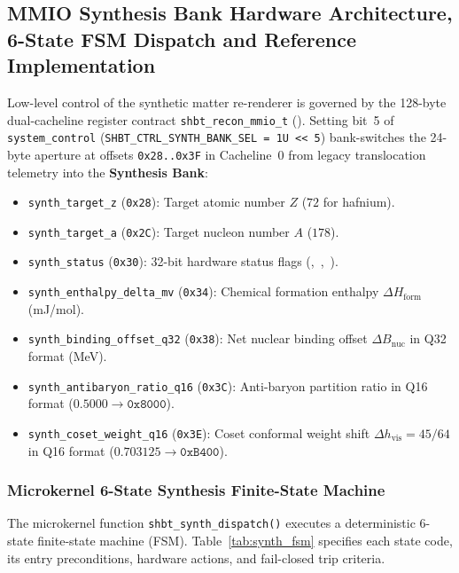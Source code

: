 \documentclass[11pt,onecolumn]{article}
\begin{document}
\FloatBarrier
\subsection[MMIO Synthesis Bank and 6-State FSM Dispatch]{MMIO Synthesis Bank Hardware Architecture, 6-State FSM Dispatch and Reference Implementation}
\label{subsec:mmio_synth_fsm}
Low-level control of the synthetic matter re-renderer is governed by the 128-byte dual-cacheline register contract \texttt{shbt\_recon\_mmio\_t} (). Setting bit~5 of \texttt{system\_control} (\texttt{SHBT\_CTRL\_SYNTH\_BANK\_SEL = 1U << 5}) bank-switches the 24-byte aperture at offsets \texttt{0x28..0x3F} in Cacheline~0 from legacy translocation telemetry into the \textbf{Synthesis Bank}:

\begin{itemize}
    \item \texttt{synth\_target\_z} (\texttt{0x28}): Target atomic number $Z$ ($72$ for hafnium).
    \item \texttt{synth\_target\_a} (\texttt{0x2C}): Target nucleon number $A$ ($178$).
    \item \texttt{synth\_status} (\texttt{0x30}): 32-bit hardware status flags (,\allowbreak\ ,\allowbreak\ ).
    \item \texttt{synth\_enthalpy\_delta\_mv} (\texttt{0x34}): Chemical formation enthalpy $\Delta H_{\text{form}}$ (mJ/mol).
    \item \texttt{synth\_binding\_offset\_q32} (\texttt{0x38}): Net nuclear binding offset $\Delta B_{\text{nuc}}$ in Q32 format (MeV).
    \item \texttt{synth\_antibaryon\_ratio\_q16} (\texttt{0x3C}): Anti-baryon partition ratio in Q16 format ($0.5000 \to \texttt{0x8000}$).
    \item \texttt{synth\_coset\_weight\_q16} (\texttt{0x3E}): Coset conformal weight shift $\Delta h_{\text{vis}} = 45/64$ in Q16 format ($0.703125 \to \texttt{0xB400}$).
\end{itemize}

\subsubsection{Microkernel 6-State Synthesis Finite-State Machine}
The microkernel function \texttt{shbt\_synth\_dispatch()} executes a deterministic 6-state finite-state machine (FSM). Table~\ref{tab:synth_fsm} specifies each state code, its entry preconditions, hardware actions, and fail-closed trip criteria.
\end{document}
